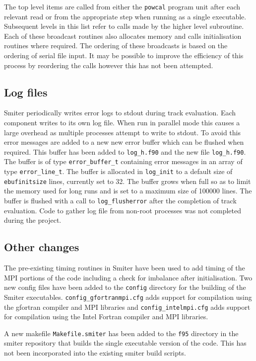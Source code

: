 The top level items are called from either the {\tt powcal} program unit after each relevant read or from the appropriate step when running as a single executable. Subsequent levels in this list refer to calls made by the higher level subroutine. Each of these broadcast routines also allocates memory and calls initialisation routines where required. The ordering of these broadcasts is based on the ordering of serial file input. It may be possible to improve the efficiency of this process by reordering the calls however this has not been attempted.


\subsection{Log files}
Smiter periodically writes error logs to stdout during track evaluation. Each component writes to its own log file. When run in parallel mode this causes a large overhead as multiple processes attempt to write to stdout. To avoid this error messages are added to a new new error buffer which can be flushed when required. This buffer has been added to {\tt log\_h.f90} and the new file {\tt log\_h.f90}. The buffer is of type {\tt error\_buffer\_t} containing error messages in an array of type {\tt error\_line\_t}. The buffer is allocated in {\tt log\_init} to a default size of {\tt ebufinitsize} lines, currently set to 32. The buffer grows when full so as to limit the memory used for long runs and is set to a maximum size of 100000 lines. The buffer is flushed with a call to {\tt log\_flusherror} after the completion of track evaluation. Code to gather log file from non-root processes was not completed during the project. 

\subsection{Other changes}
The pre-existing timing routines in Smiter have been used to add timing of the MPI portions of the code including a check for imbalance after initialisation. Two new config files have been added to the {\tt config} directory for the building of the Smiter executables. {\tt config\_gfortranmpi.cfg} adds support for compilation using the gfortran compiler and MPI libraries and {\tt config\_intelmpi.cfg} adds support for compilation using the Intel Fortran compiler and MPI libraries.

A new makefile {\tt Makefile.smiter} has been added to the {\tt f95} directory in the smiter repository that builds the single executable version of the code. This has not been incorporated into the existing smiter build scripts.


